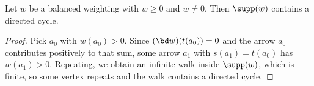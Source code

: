 \begin{lemma}[Support]\label{sh-0406}
Let $w$ be a balanced weighting with $w \geq 0$ and $w \neq 0$. Then $\supp(w)$ contains a directed cycle.
\end{lemma}
\begin{proof}
Pick $a_{0}$ with $w(a_{0}) > 0$. Since $(\bd w)(t(a_{0})) = 0$ and the arrow $a_{0}$ contributes positively to that sum, some arrow $a_{1}$ with $s(a_{1}) = t(a_{0})$ has $w(a_{1}) > 0$. Repeating, we obtain an infinite walk inside $\supp(w)$, which is finite, so some vertex repeats and the walk contains a directed cycle.
\end{proof}
